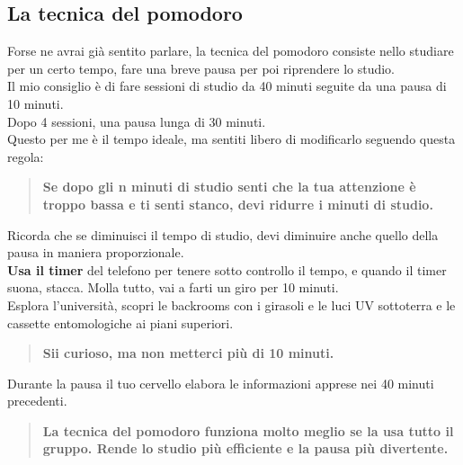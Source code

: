\documentclass[18pt]{extarticle}
\begin{document}
\subsection{La tecnica del pomodoro}
Forse ne avrai già sentito parlare, la tecnica del pomodoro consiste nello studiare per un certo tempo, fare una breve pausa per poi riprendere lo studio.\\
Il mio consiglio è di fare sessioni di studio da 40 minuti seguite da una pausa di 10 minuti.\\
Dopo 4 sessioni, una pausa lunga di 30 minuti.\\
Questo per me è il tempo ideale, ma sentiti libero di modificarlo seguendo questa regola:
\begin{quote}
\textbf{Se dopo gli n minuti di studio senti che la tua attenzione è troppo bassa e ti senti stanco, devi ridurre i minuti di studio.}
\end{quote}
Ricorda che se diminuisci il tempo di studio, devi diminuire anche quello della pausa in maniera proporzionale.\\
\textbf{Usa il timer} del telefono per tenere sotto controllo il tempo, e quando il timer suona, stacca. Molla tutto, vai a farti un giro per 10 minuti.\\
Esplora l'università, scopri le backrooms con i girasoli e le luci UV sottoterra e le cassette entomologiche ai piani superiori.
\begin{quote}
\textbf{Sii curioso, ma non metterci più di 10 minuti.}
\end{quote}
Durante la pausa il tuo cervello elabora le informazioni apprese nei 40 minuti precedenti.
\begin{quote}
\textbf{La tecnica del pomodoro funziona molto meglio se la usa tutto il gruppo. Rende lo studio più efficiente e la pausa più divertente.}
\end{quote}%
\end{document}

